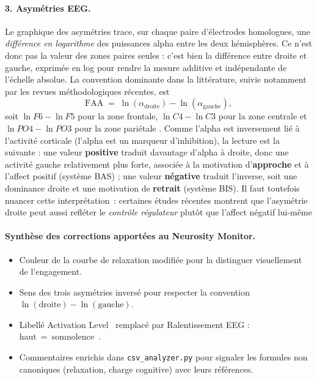 \documentclass[11pt,a4paper]{article}
\begin{document}
\paragraph{3. Asymétries EEG.}
Le graphique des asymétries trace, sur chaque paire d'électrodes homologues, une \emph{différence en logarithme} des puissances alpha entre les deux hémisphères. Ce n'est donc pas la valeur des zones paires seules : c'est bien la différence entre droite et gauche, exprimée en log pour rendre la mesure additive et indépendante de l'échelle absolue. La convention dominante dans la littérature, suivie notamment par les revues méthodologiques récentes, est
\[
\mathrm{FAA} \;=\; \ln(\alpha_{\mathrm{droite}}) - \ln(\alpha_{\mathrm{gauche}}),
\]
soit $\ln F6 - \ln F5$ pour la zone frontale, $\ln C4 - \ln C3$ pour la zone centrale et $\ln PO4 - \ln PO3$ pour la zone pariétale \cite{Smith2017,Reznik2018,MendezBertolo2024,Gilam2022}. Comme l'alpha est inversement lié à l'activité corticale (l'alpha est un marqueur d'inhibition), la lecture est la suivante : une valeur \textbf{positive} traduit davantage d'alpha à droite, donc une activité gauche relativement plus forte, associée à la motivation d'\textbf{approche} et à l'affect positif (système BAS) ; une valeur \textbf{négative} traduit l'inverse, soit une dominance droite et une motivation de \textbf{retrait} (système BIS). Il faut toutefois nuancer cette interprétation~: certaines études récentes montrent que l'asymétrie droite peut aussi refléter le \emph{contrôle régulateur} plutôt que l'affect négatif lui-même \cite{Neal2019,Smith2017}

\paragraph{Synthèse des corrections apportées au Neurosity Monitor.}
\begin{itemize}
\item Couleur de la courbe de relaxation modifiée pour la distinguer visuellement de l'engagement.
\item Sens des trois asymétries inversé pour respecter la convention $\ln(\mathrm{droite}) - \ln(\mathrm{gauche})$.
\item Libellé \og Activation Level~\fg{} remplacé par \og Ralentissement EEG : haut~=~somnolence~\fg{}.
\item Commentaires enrichis dans \texttt{csv\_analyzer.py} pour signaler les formules non canoniques (relaxation, charge cognitive) avec leurs références.
\end{itemize}
\end{document}

